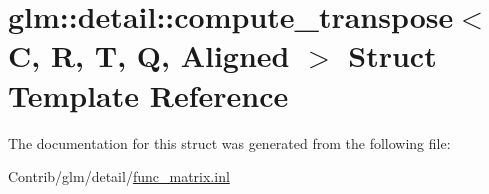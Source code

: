 \hypertarget{structglm_1_1detail_1_1compute__transpose}{}\section{glm\+:\+:detail\+:\+:compute\+\_\+transpose$<$ C, R, T, Q, Aligned $>$ Struct Template Reference}
\label{structglm_1_1detail_1_1compute__transpose}


The documentation for this struct was generated from the following file\+:\begin{DoxyCompactItemize}
\item 
Contrib/glm/detail/\mbox{\hyperlink{func__matrix_8inl}{func\+\_\+matrix.\+inl}}\end{DoxyCompactItemize}
